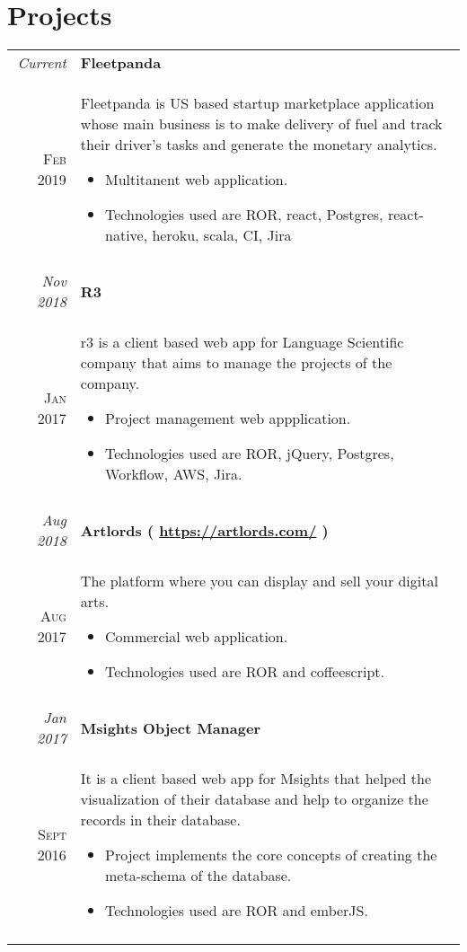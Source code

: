 \documentclass[a4paper,10pt]{article}
\begin{document}
\section{Projects}
\begin{tabular}{r|p{11cm}}

\emph{Current} & \textbf{Fleetpanda}\\ \textsc{Feb 2019} & \small{Fleetpanda is US based startup marketplace application whose main business is to make delivery of fuel and track their driver's tasks and generate the monetary analytics.
 
\footnotesize{
\begin{itemize}
\item Multitanent web application.
\item Technologies used are ROR, react, Postgres, react-native, heroku, scala, CI, Jira
\end{itemize}
}}\\\multicolumn{2}{c}{} \\


\emph{Nov 2018} & \textbf{R3}\\ \textsc{Jan 2017} & \small{r3 is a client based web app for Language Scientific company that aims to manage the projects of the company. 

\footnotesize{
\begin{itemize}
\item Project management web appplication.
\item Technologies used are ROR, jQuery, Postgres, Workflow, AWS, Jira.
\end{itemize}
}}\\\multicolumn{2}{c}{} \\


\emph{Aug 2018} & \textbf{Artlords ( \href{https://artlords.com/}{https://artlords.com/} )}\\ \textsc{Aug 2017} & \small{The platform where you can display and sell your digital arts. 

\footnotesize{
\begin{itemize}
\item Commercial web application.
\item Technologies used are ROR and coffeescript.
\end{itemize}
}}\\\multicolumn{2}{c}{} \\

\emph{Jan 2017} & \textbf{Msights Object Manager}\\ \textsc{Sept 2016} & \small{It is a client based web app for Msights that helped the visualization of their database and help to organize the records in their database. 
\footnotesize{
\begin{itemize}
\item Project implements the core concepts of creating the meta-schema of the database.
\item Technologies used are ROR and emberJS.
\end{itemize}
}}\\\multicolumn{2}{c}{} \\


\end{tabular}
\end{document}
